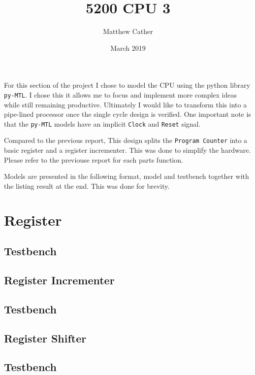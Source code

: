 \documentclass{article}
\title{5200 CPU 3}
\author{Matthew Cather}
\date{March 2019}
\begin{document}
\maketitle

For this section of the project I chose to model the CPU using the python library \texttt{py-MTL}. I chose this it allows me to focus and implement more complex ideas while still remaining productive. Ultimately I would like to transform this into a pipe-lined processor once the single cycle design is verified. One important note is that the \texttt{py-MTL} models have an implicit \texttt{Clock} and \texttt{Reset} signal.

Compared to the previous report, This design splits the \texttt{Program Counter} into a basic register and a register incrementer. This was done to simplify the hardware. Please refer to the previouse report for each parts function.

Models are presented in the following format, model and testbench together with the listing result at the end. This was done for brevity.

\tableofcontents
\clearpage

\section{Register}

\subsection{Testbench}


\subsection{Register Incrementer}

\subsection{Testbench}


\subsection{Register Shifter}

\subsection{Testbench}

\end{document}

